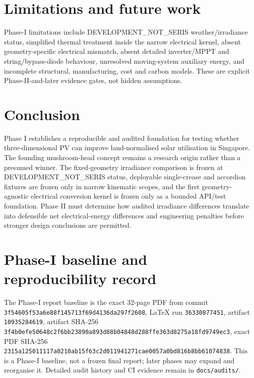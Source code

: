 \documentclass[11pt,a4paper]{article}
\begin{document}
\section{Limitations and future work}
Phase-I limitations include DEVELOPMENT\_NOT\_SERIS weather/irradiance status, simplified thermal treatment inside the narrow electrical kernel, absent geometry-specific electrical mismatch, absent detailed inverter/MPPT and string/bypass-diode behaviour, unresolved moving-system auxiliary energy, and incomplete structural, manufacturing, cost and carbon models. These are explicit Phase-II-and-later evidence gates, not hidden assumptions.

\section{Conclusion}
Phase I establishes a reproducible and audited foundation for testing whether three-dimensional PV can improve land-normalised solar utilisation in Singapore. The founding mushroom-head concept remains a research origin rather than a presumed winner. The fixed-geometry irradiance comparison is frozen at DEVELOPMENT\_NOT\_SERIS status, deployable single-crease and accordion fixtures are frozen only in narrow kinematic scopes, and the first geometry-agnostic electrical conversion kernel is frozen only as a bounded API/test foundation. Phase II must determine how audited irradiance differences translate into defensible net electrical-energy differences and engineering penalties before stronger design conclusions are permitted.




\appendix
\section{Phase-I baseline and reproducibility record}
The Phase-I report baseline is the exact 32-page PDF from commit \texttt{3f54605f53a6e88f145713f69d4136da297f2608}, LaTeX run \texttt{36330877451}, artifact \texttt{10935284619}, artifact SHA-256 \texttt{3f4b0efe50648c2f6bb23890a893d88b04848d288ffe363d8275a18fd9749ec3}, exact PDF SHA-256 \texttt{2315a125011117a0210ab15f63c2d011941271cae0057a0bd816b8bb61074838}. This is a Phase-I baseline, not a frozen final report; later phases may expand and reorganise it. Detailed audit history and CI evidence remain in \texttt{docs/audits/}.
\end{document}
